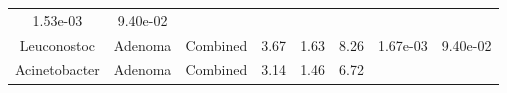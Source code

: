 \documentclass[12pt,]{article}
\begin{document}
\begin{longtable}[]{@{}cccccccc@{}}
\begin{minipage}[t]{0.06\columnwidth}
1.53e-03\strut
\end{minipage} & \begin{minipage}[t]{0.06\columnwidth}\centering\strut
9.40e-02\strut
\end{minipage}\tabularnewline
\begin{minipage}[t]{0.19\columnwidth}\centering\strut
Leuconostoc\strut
\end{minipage} & \begin{minipage}[t]{0.07\columnwidth}\centering\strut
Adenoma\strut
\end{minipage} & \begin{minipage}[t]{0.09\columnwidth}\centering\strut
Combined\strut
\end{minipage} & \begin{minipage}[t]{0.03\columnwidth}\centering\strut
3.67\strut
\end{minipage} & \begin{minipage}[t]{0.14\columnwidth}\centering\strut
1.63\strut
\end{minipage} & \begin{minipage}[t]{0.14\columnwidth}\centering\strut
8.26\strut
\end{minipage} & \begin{minipage}[t]{0.06\columnwidth}\centering\strut
1.67e-03\strut
\end{minipage} & \begin{minipage}[t]{0.06\columnwidth}\centering\strut
9.40e-02\strut
\end{minipage}\tabularnewline
\begin{minipage}[t]{0.19\columnwidth}\centering\strut
Acinetobacter\strut
\end{minipage} & \begin{minipage}[t]{0.07\columnwidth}\centering\strut
Adenoma\strut
\end{minipage} & \begin{minipage}[t]{0.09\columnwidth}\centering\strut
Combined\strut
\end{minipage} & \begin{minipage}[t]{0.03\columnwidth}\centering\strut
3.14\strut
\end{minipage} & \begin{minipage}[t]{0.14\columnwidth}\centering\strut
1.46\strut
\end{minipage} & \begin{minipage}[t]{0.14\columnwidth}\centering\strut
6.72\strut
\end{minipage} & \begin{minipage}[t]{0.06\columnwidth}\centering\strut

\end{minipage}
\end{longtable}
\end{document}
